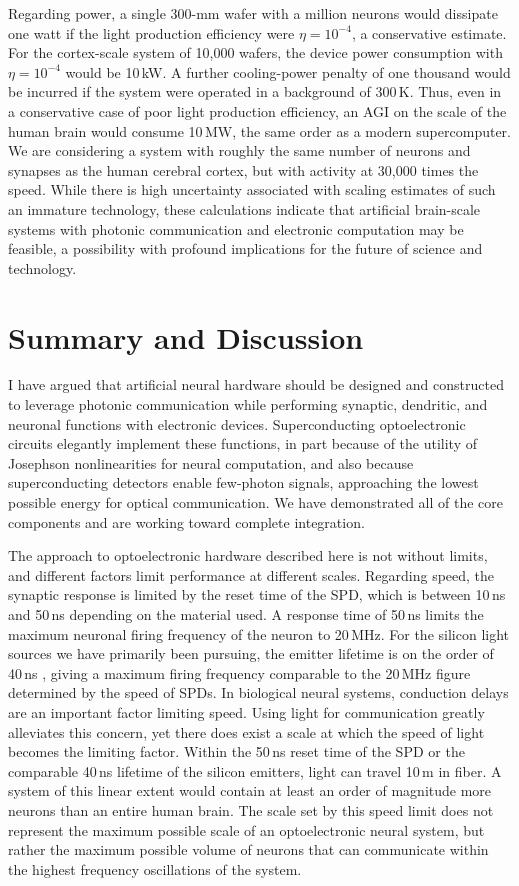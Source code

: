 \documentclass[twocolumn]{article}
\begin{document}
Regarding power, a single 300-mm wafer with a million neurons would dissipate one watt if the light production efficiency were $\eta = 10^{-4}$, a conservative estimate. For the cortex-scale system of 10,000 wafers, the device power consumption with $\eta = 10^{-4}$ would be 10\,kW. A further cooling-power penalty of one thousand would be incurred if the system were operated in a background of 300\,K. Thus, even in a conservative case of poor light production efficiency, an AGI on the scale of the human brain would consume 10\,MW, the same order as a modern supercomputer. We are considering a system with roughly the same number of neurons and synapses as the human cerebral cortex, but with activity at 30,000 times the speed. While there is high uncertainty associated with scaling estimates of such an immature technology, these calculations indicate that artificial brain-scale systems with photonic communication and electronic computation may be feasible, a possibility with profound implications for the future of science and technology. 

\section{\label{sec:discussion}Summary and Discussion}
I have argued that artificial neural hardware should be designed and constructed to leverage photonic communication while performing synaptic, dendritic, and neuronal functions with electronic devices. Superconducting optoelectronic circuits elegantly implement these functions, in part because of the utility of Josephson nonlinearities for neural computation, and also because superconducting detectors enable few-photon signals, approaching the lowest possible energy for optical communication. We have demonstrated all of the core components and are working toward complete integration.

The approach to optoelectronic hardware described here is not without limits, and different factors limit performance at different scales. Regarding speed, the synaptic response is limited by the reset time of the SPD, which is between 10\,ns and 50\,ns depending on the material used. A response time of 50\,ns limits the maximum neuronal firing frequency of the neuron to 20\,MHz. For the silicon light sources we have primarily been pursuing, the emitter lifetime is on the order of 40\,ns \cite{buta2020}, giving a maximum firing frequency comparable to the 20\,MHz figure determined by the speed of SPDs. In biological neural systems, conduction delays are an important factor limiting speed. Using light for communication greatly alleviates this concern, yet there does exist a scale at which the speed of light becomes the limiting factor. Within the 50\,ns reset time of the SPD or the comparable 40\,ns lifetime of the silicon emitters, light can travel 10\,m in fiber. A system of this linear extent would contain at least an order of magnitude more neurons than an entire human brain. The scale set by this speed limit does not represent the maximum possible scale of an optoelectronic neural system, but rather the maximum possible volume of neurons that can communicate within the highest frequency oscillations of the system.
\end{document}
